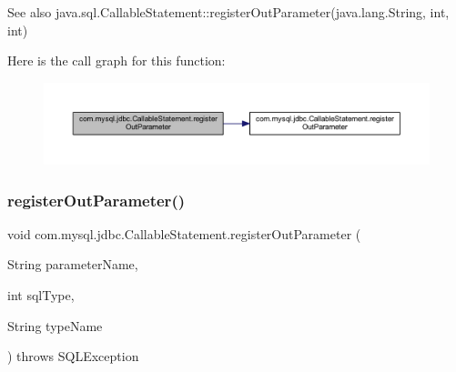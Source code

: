 \begin{DoxySeeAlso}{See also}
java.\+sql.\+Callable\+Statement\+::register\+Out\+Parameter(java.\+lang.\+String, int, int) 
\end{DoxySeeAlso}
Here is the call graph for this function\+:\nopagebreak
\begin{figure}[H]
\begin{center}
\leavevmode
\includegraphics[width=350pt]{classcom_1_1mysql_1_1jdbc_1_1_callable_statement_aac8fb04a2335f34f237458370e44eb19_cgraph}
\end{center}
\end{figure}
\mbox{\label{classcom_1_1mysql_1_1jdbc_1_1_callable_statement_a8b1ce8c9788c3c3cdcd60db1aeebe961}} 
\subsubsection{\texorpdfstring{register\+Out\+Parameter()}{registerOutParameter()}\hspace{0.1cm}{\footnotesize\ttfamily [6/6]}}
{\footnotesize\ttfamily void com.\+mysql.\+jdbc.\+Callable\+Statement.\+register\+Out\+Parameter (\begin{DoxyParamCaption}\item[{String}]{parameter\+Name,  }\item[{int}]{sql\+Type,  }\item[{String}]{type\+Name }\end{DoxyParamCaption}) throws S\+Q\+L\+Exception}

